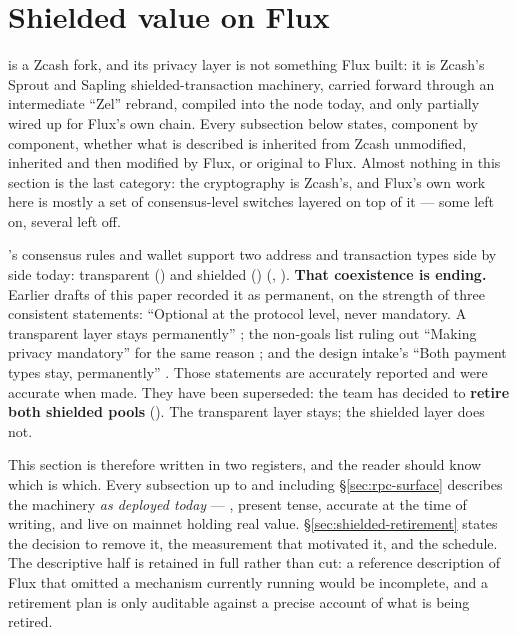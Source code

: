 \section{Shielded value on Flux}
\label{sec:shielded-value}\label{sec:privacy}

\fluxd is a Zcash fork, and its privacy layer is not something Flux built: it is Zcash's Sprout and
Sapling shielded-transaction machinery, carried forward through an intermediate ``Zel'' rebrand,
compiled into the node today, and only partially wired up for Flux's own chain. Every subsection
below states, component by component, whether what is described is inherited from Zcash unmodified,
inherited and then modified by Flux, or original to Flux. Almost nothing in this section is the last
category: the cryptography is Zcash's, and Flux's own work here is mostly a set of consensus-level
switches layered on top of it — some left on, several left off.

\fluxd's consensus rules and wallet support two address and transaction types side by side today:
transparent (\taddr) and shielded (\zaddr) (\shipped, ).
\textbf{That coexistence is ending.} Earlier drafts of this paper recorded it as permanent, on the
strength of three consistent statements: ``Optional at the protocol level, never mandatory. A
transparent layer stays permanently'' ; the non-goals list
ruling out ``Making privacy mandatory'' for the same reason
; and the design intake's ``Both payment types stay,
permanently'' . Those statements are accurately reported and were
accurate when made. They have been superseded: the team has decided to \textbf{retire both shielded
pools}  (\planned). The transparent layer stays; the
shielded layer does not.

This section is therefore written in two registers, and the reader should know which is which. Every
subsection up to and including \S\ref{sec:rpc-surface} describes the machinery \emph{as deployed
today} --- \shipped, present tense, accurate at the time of writing, and live on mainnet holding real
value. \S\ref{sec:shielded-retirement} states the decision to remove it, the measurement that
motivated it, and the schedule. The descriptive half is retained in full rather than cut: a reference
description of Flux that omitted a mechanism currently running would be incomplete, and a retirement
plan is only auditable against a precise account of what is being retired.

